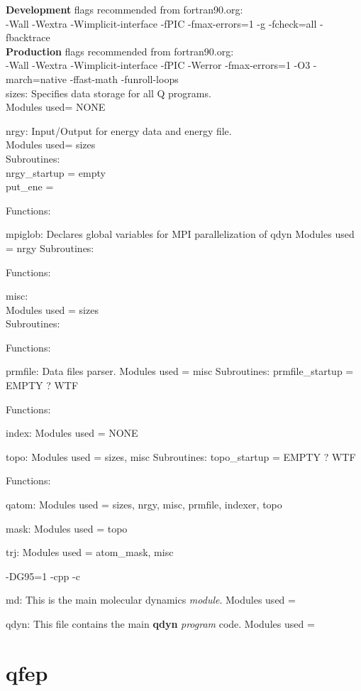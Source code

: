 \documentclass[10pt, oneside, pdftex]{article}
\begin{document}
\textbf{Development} flags recommended from fortran90.org:\\
-Wall -Wextra -Wimplicit-interface -fPIC -fmax-errors=1 -g -fcheck=all -fbacktrace\\

\textbf{Production} flags recommended from fortran90.org:\\
-Wall -Wextra -Wimplicit-interface -fPIC -Werror -fmax-errors=1 -O3 -march=native -ffast-math -funroll-loops\\

sizes: Specifies data storage for all Q programs.\\
Modules used= NONE

nrgy: Input/Output for energy data and energy file.\\
Modules used= sizes\\
Subroutines:\\
  nrgy\_startup = empty\\
  put\_ene =

Functions:

mpiglob: Declares global variables for MPI parallelization of qdyn
Modules used = nrgy
Subroutines:

Functions:


misc:\\
Modules used = sizes\\
Subroutines:

Functions:


prmfile: Data files parser.
Modules used = misc
Subroutines:
  prmfile\_startup = EMPTY ? WTF


Functions:


index:
Modules used = NONE


topo:
Modules used = sizes, misc
Subroutines:
  topo\_startup = EMPTY ? WTF


Functions:


qatom:
Modules used = sizes, nrgy, misc, prmfile, indexer, topo


mask:
Modules used = topo


trj:
Modules used = atom\_mask, misc




-DG95=1 -cpp -c

md: This is the main molecular dynamics \textit{module}.
Modules used =


qdyn: This file contains the main \textbf{qdyn} \textit{program} code.
Modules used =



\section{qfep}
\label{qfep}
\end{document}
